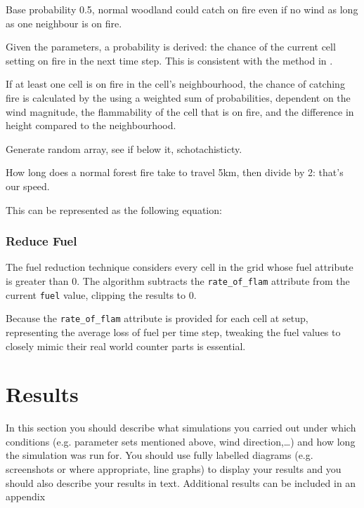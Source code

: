 \documentclass[11pt, a4paper, titlepage]{article}
\newcommand{\code}[1]{\colorbox{light-gray}{\texttt{#1}}}
\begin{document}



Base probability 0.5, normal woodland could catch on fire even if no wind as long as one neighbour is on fire. 

Given the parameters, a probability is derived: the chance of the current cell setting on fire in the next time step. This is consistent with the method in \cite{ALEXANDRIDIS2008191}.

If at least one cell is on fire in the cell's neighbourhood, the chance of catching fire is calculated by the using a weighted sum of probabilities, dependent on the wind magnitude, the flammability of the cell that is on fire, and the difference in height compared to the neighbourhood.

Generate random array, see if below it, schotachisticty.


How long does a normal forest fire take to travel 5km, then divide by 2: that's our speed. 


This can be represented as the following equation:
\subsubsection{Reduce Fuel}
The fuel reduction technique considers every cell in the grid whose fuel attribute is greater than 0. The algorithm subtracts the \code{rate\_of\_flam} attribute from the current \code{fuel} value, clipping the results to 0. 

Because the \code{rate\_of\_flam} attribute is provided for each cell at setup, representing the average loss of fuel per time step, tweaking the fuel values to closely mimic their real world counter parts is essential.

\section{Results}
\begin{displayquote}
  In this section you should describe what simulations you
carried out under which conditions (e.g. parameter sets mentioned above, wind direction,…) and
how long the simulation was run for. You should use fully labelled diagrams (e.g. screenshots or
where appropriate, line graphs) to display your results and you should also describe your results in
text. Additional results can be included in an appendix
\end{displayquote}
\end{document}

